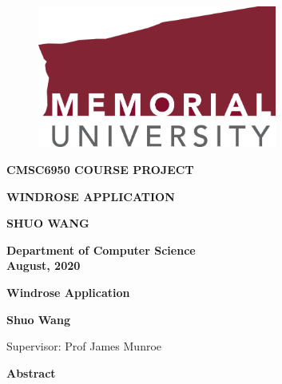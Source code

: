 \documentclass[10pt]{report}
\begin{document}
\begin{titlepage}
   \begin{center}
   \begin{doublespacing}

       \begin{figure}
       \centering
       \includegraphics[width=0.7\textwidth]{images/MUN_Logo_RGB.png}
       \end{figure}
       
       
       \vspace*{5mm}
       {\large\textbf{CMSC6950 COURSE PROJECT}}

       \vspace{30mm}
       
       {\Large\textbf{WINDROSE APPLICATION}}

    
            
       \vspace{30mm}

       {\Large\textbf{SHUO WANG}\\
       }

       \vfill
       {\large \textbf{Department of Computer Science}\\
       \textbf{August, 2020}}
       
    \end{doublespacing}

   \end{center}
\end{titlepage}


\doublespacing
 \thispagestyle{plain}
\begin{center}
    \Large
    \textbf{Windrose Application}
        
    \vspace{0.4cm}
    \textbf{Shuo Wang}
    
    \vspace{0.4cm}
    \large{Supervisor: Prof James Munroe}
       
    \vspace{0.9cm}
    \textbf{Abstract}
\end{center}
\end{document}
